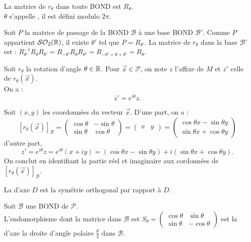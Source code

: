 \documentclass{book}
\begin{document}
\begin{DefinitionProposition}
La matrice de $r_{\theta}$ dans toute BOND est $R_{\theta}$.\\
$\theta$ s'appelle , il est défini modulo $2\pi$.
\end{DefinitionProposition}
\begin{Demonstration}
Soit $P$ la matrice de passage de la BOND $\mathcal{B}$ à une base BOND $\mathcal{B}'$. Comme $P$ appartient $\mathcal{SO}_2(\mathbb{R})$, il existe $\theta'$ tel que $P=R_{\theta'}$. La  matrice de $r_{\theta}$ dans la base $\mathcal{B}'$  est : $R_{\theta'}^{-1}R_{\theta}R_{\theta'}=R_{-\theta'}R_{\theta}R_{\theta'}=R_{-\theta'+\theta+\theta'}=R_{\theta}.$
\end{Demonstration}
\begin{Proposition}
Soit $r_\theta$ la rotation d'angle $\theta \in \mathbb{R}$. Pour $\vec{x} \in  \mathcal{P}$, on note $z$ l'affixe de $M$ et $z'$ celle de $r_\theta(\vec{x})$.\\
On a :
$$z' = e^{i\theta} z.$$
\end{Proposition}
\begin{Demonstration}
Soit $(x,y)$ les coordonnées du vecteur $\vec{x}$. D'une part, on a :
$$
[r_\theta(\vec{x})]_{\mathcal{B}}=\begin{pmatrix} \cos \theta &-\sin \theta \\ \sin \theta &  \cos \theta \end{pmatrix}=\begin{pmatrix} x&y \end{pmatrix}=\begin{pmatrix}\cos \theta x -\sin \theta y  \\ \sin \theta x + \cos \theta y \end{pmatrix} 
$$
d'autre part, 
$$z' = e^{i\theta} z=e^{i\theta}(x+iy)=(\cos \theta x -\sin \theta y) +i(\sin \theta x + \cos \theta y).$$
On conclut en identifiant la partie réel et imaginaire aux cordonnées de $[r_\theta(\vec{x})]_{\mathcal{B}}$.
\end{Demonstration}
\begin{Definition}[Reflexion]
La  d'axe $D$ est la symétrie orthogonal par rapport à $D$. 
\end{Definition}

\begin{Proposition}
Soit $\mathcal{B}$  une  BOND de $\mathcal{P}$.\\
L'endomorphisme dont la matrice dans $\mathcal{B}$ est $S_\theta = \begin{pmatrix} \cos \theta &\sin \theta \\ \sin \theta &  -\cos \theta \end{pmatrix}$ est la  d'axe la droite d'angle polaire $\frac \theta 2$ dans $\mathcal{B}$.
\end{Proposition}
\end{document}
